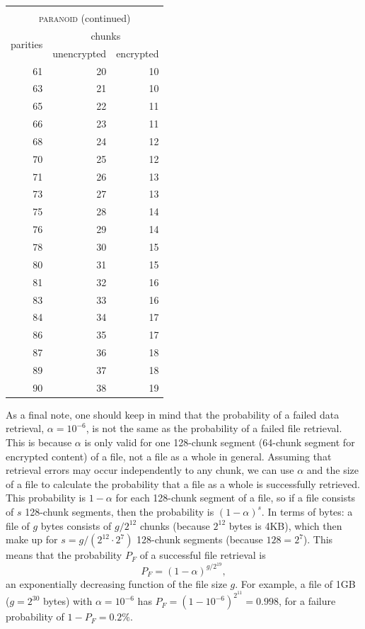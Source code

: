 \documentclass[manuscript,screen,review]{acmart}
\begin{document}
\begin{table}[!ht]
\begin{minipage}{.49\linewidth}
\centering
\begin{tabular}{|r|r|r|}
\multicolumn{3}{c}{\textsc{}}\\
\multicolumn{3}{c}{\textsc{paranoid} (continued)}\\\hline
\multirow{2}{1.5cm}{\centering 
 parities } 
&\multicolumn{2}{|c|}{ chunks }\\\cline{2-3}
&\multicolumn{1}{|c|}{unencrypted} 
&\multicolumn{1}{|c|}{encrypted} \\\hline\hline
61 & 20 & 10\\
63 & 21 & 10\\
65 & 22 & 11\\
66 & 23 & 11\\
68 & 24 & 12\\
70 & 25 & 12\\
71 & 26 & 13\\
73 & 27 & 13\\
75 & 28 & 14\\
76 & 29 & 14\\
78 & 30 & 15\\
80 & 31 & 15\\
81 & 32 & 16\\
83 & 33 & 16\\
84 & 34 & 17\\
86 & 35 & 17\\
87 & 36 & 18\\
89 & 37 & 18\\
90 & 38 & 19\\
\hline
\end{tabular}
\end{minipage}
\label{tbl:paranoid}
\end{table}

As a final note, one should keep in mind that the probability of a failed data retrieval, $\alpha = 10^{-6}$, is not the same as the probability of a failed file retrieval. This is because $\alpha$ is only valid for one 128-chunk segment (64-chunk segment for encrypted content) of a file, not a file as a whole in general. Assuming that retrieval errors may occur independently to any chunk, we can use $\alpha$ and the size of a file to calculate the probability that a file as a whole is successfully retrieved. This probability is $1 - \alpha$ for each 128-chunk segment of a file, so if a file consists of $s$ 128-chunk segments, then the probability is $(1-\alpha)^s$. In terms of bytes: a file of $g$ bytes consists of $g / 2^{12}$ chunks (because $2^{12}$ bytes is 4KB), which then make up for $s = g / (2^{12} \cdot 2^{7})$ 128-chunk segments (because $128 = 2^7$). This means that the probability $P_F$ of a successful file retrieval is
\begin{equation}
  P_F = (1 - \alpha)^{g/2^{19}} ,
  \label{eq-P-file}
\end{equation}
an exponentially decreasing function of the file size $g$. For example, a file of 1GB ($g = 2^{30}$ bytes) with $\alpha = 10^{-6}$ has $P_F = (1 - 10^{-6})^{2^{11}} = 0.998$, for a failure probability of $1 - P_F = 0.2\%$.
\end{document}
